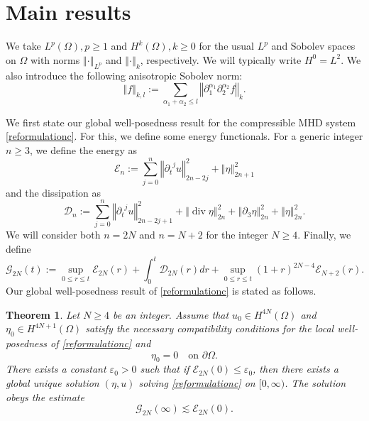 \documentclass[a4paper,reqno,11pt]{amsart}
\newtheorem{theorem}{Theorem}[section]
\numberwithin{equation}{section}
\providecommand{\norm}[1]{\left\Vert#1\right\Vert}
\providecommand{\sd}[1]{\mathcal{D}_{#1}}
\providecommand{\se}[1]{\mathcal{E}_{#1}}
\providecommand{\ns}[1]{\norm{#1}^2}
\providecommand{\norm}[1]{\left\Vert#1\right\Vert}
\begin{document}
\section{Main results}

We take $L^p(\Omega),p\ge 1$ and $H^k(\Omega),k\ge 0$ for the usual $L^p$ and Sobolev spaces on $\Omega$ with norms $\norm{\cdot}_{L^p}$ and $\norm{\cdot}_k$, respectively. We will typically write $H^0 = L^2$. We also introduce the following anisotropic Sobolev norm:
\begin{equation}
\norm{f}_{k,l}:=\sum_{ {\alpha}_1+{\alpha}_2 \le l}\norm{{\partial}_1^{{\alpha}_1}{\partial}_2^{{\alpha}_2} f}_k.
\end{equation}

We first state our global well-posedness result for the compressible MHD system \eqref{reformulationc}. For this, we define some energy functionals. For a generic integer $n\ge 3$, we define the energy as
\begin{equation}\label{p_energy_defc}
 \se{n} := \sum_{j=0}^{n}  \ns{{\partial_t}^j u}_{2n-2j} +\ns{ \eta}_{2n+1}
\end{equation}
and the dissipation as
\begin{equation}\label{p_dissipation_defc}
 \sd{n} :=   \sum_{j=0}^{n}  \ns{{\partial_t}^j u}_{2n-2j+1}
+\ns{\operatorname{div}  \eta}_{2n }+\ns{{\partial}_3  \eta}_{2n }+\ns{ \eta}_{2n }.
\end{equation}
We will consider both $n=2N$ and $n=N+2$ for the integer $N\ge 4$. Finally, we define
\begin{equation}\label{G_defc}
\mathcal{G}_{2N}(t) :=\sup_{0 \le r \le t} \se{2N} (r) + \int_0^t \sd{2N} (r) dr + \sup_{0 \le r \le t} (1+r)^{2N-4} \se{N+2} (r).
\end{equation}
Our global well-posedness result of \eqref{reformulationc} is stated as follows.
\begin{theorem}\label{thc}
Let $N\ge 4$ be an integer. Assume that $u_0\in H^{4N}(\Omega)$ and $\eta_0\in H^{4N+1}(\Omega)$ satisfy the necessary compatibility conditions for the local well-posedness of \eqref{reformulationc} and
\begin{equation}
\eta_0=0\quad\text{on }{\partial}\Omega.
\end{equation}
There exists a constant $\varepsilon_0>0$ such that if $\se{2N} (0) \le \varepsilon_0$, then there exists a global unique solution $(\eta,u)$ solving  \eqref{reformulationc} on $[0,\infty)$. The solution obeys the estimate
\begin{equation}
\mathcal{G}_{2N}(\infty) {\lesssim} \se{2N} (0).
\end{equation}
\end{theorem}
\end{document}
